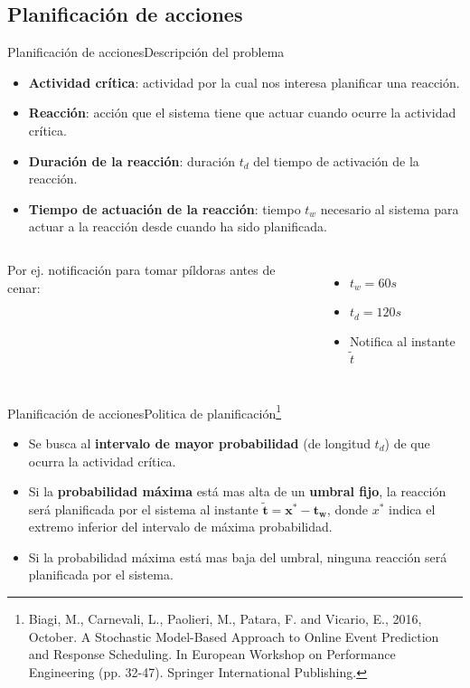 \documentclass[9pt, handout]{beamer}
\begin{document}
    \subsection{Planificación de acciones}
      \begin{frame}{Planificación de acciones}{Descripción del problema}
        \begin{itemize}
          \item \textbf{Actividad crítica}: actividad por la cual nos interesa planificar una reacción.
          \item \textbf{Reacción}: acción que el sistema tiene que actuar cuando ocurre la actividad crítica.
          \item \textbf{Duración de la reacción}: duración $t_d$ del tiempo de activación de la reacción.
          \item \textbf{Tiempo de actuación de la reacción}: tiempo $t_w$ necesario al sistema para actuar a la reacción desde cuando ha sido planificada.
        \end{itemize}
        
      	\begin{columns}
      		\centering
      		
      		Por ej. notificación para tomar píldoras antes de cenar:
      		\begin{itemize}
      			\item $t_w = 60s$
      			\item $t_d = 120s$
      			\item Notifica al instante $\tilde t$
      		\end{itemize}
      	\end{columns}
      \end{frame}
      
      \begin{frame}{Planificación de acciones}{Politica de planificación\footnote{Biagi, M., Carnevali, L., Paolieri, M., Patara, F. and Vicario, E., 2016, October. A Stochastic Model-Based Approach to Online Event Prediction and Response Scheduling. In European Workshop on Performance Engineering (pp. 32-47). Springer International Publishing.}}
        \begin{itemize}
          \item Se busca al \textbf{intervalo de mayor probabilidad} (de longitud $t_d$) de que ocurra la actividad crítica.
          \item Si la \textbf{probabilidad máxima} está mas alta de un \textbf{umbral fijo}, la reacción será planificada por el sistema al instante $\boldsymbol{\tilde t = x^* - t_w}$, donde $x^*$ indica el extremo inferior del intervalo de máxima probabilidad.
          \item Si la probabilidad máxima está mas baja del umbral, ninguna reacción será planificada por el sistema.
        \end{itemize}
        \vspace{-1em}
      	\centering
      	
      \end{frame}
      
\end{document}
